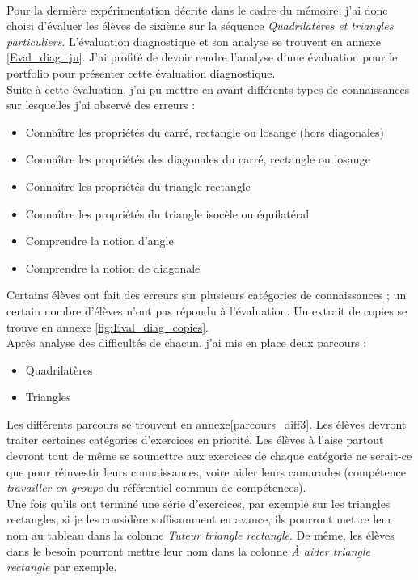 {\paragraph{} Pour la dernière expérimentation décrite dans le cadre du mémoire, j'ai donc choisi d'évaluer les élèves de sixième sur la séquence \textit{Quadrilatères et triangles particuliers}. L'évaluation diagnostique et son analyse se trouvent en annexe \ref{Eval_diag_ju}. J'ai profité de devoir rendre l'analyse d'une évaluation pour le portfolio pour présenter cette évaluation diagnostique.\\
Suite à cette évaluation, j'ai pu mettre en avant différents types de connaissances sur lesquelles j'ai observé des erreurs :
\begin{itemize}
	\item Connaître les propriétés du carré, rectangle ou losange (hors diagonales)
	\item Connaître les propriétés des diagonales du carré, rectangle ou losange
	\item Connaître les propriétés du triangle rectangle
	\item Connaître les propriétés du triangle isocèle ou équilatéral
	\item Comprendre la notion d'angle
	\item Comprendre la notion de diagonale
\end{itemize}
Certains élèves ont fait des erreurs sur plusieurs catégories de connaissances ; un certain nombre d'élèves n'ont pas répondu à l'évaluation. Un extrait de copies se trouve en annexe \ref{fig:Eval_diag_copies}.\\
Après analyse des difficultés de chacun, j'ai mis en place deux parcours :
\begin{itemize}
\item Quadrilatères
\item Triangles
\end{itemize}
Les différents parcours se trouvent en annexe\ref{parcours_diff3}. Les élèves devront traiter certaines catégories d'exercices en priorité.
Les élèves à l'aise partout devront tout de même se soumettre aux exercices de chaque catégorie ne serait-ce que pour réinvestir leurs connaissances, voire aider leurs camarades (compétence \textit{travailler en groupe} du référentiel commun de compétences).\\
Une fois qu'ils ont terminé une série d'exercices, par exemple sur les triangles rectangles, si je les considère suffisamment en avance, ils pourront mettre leur nom au tableau dans la colonne \textit{Tuteur triangle rectangle}. De même, les élèves dans le besoin pourront mettre leur nom dans la colonne \textit{À aider triangle rectangle} par exemple.\\
}
